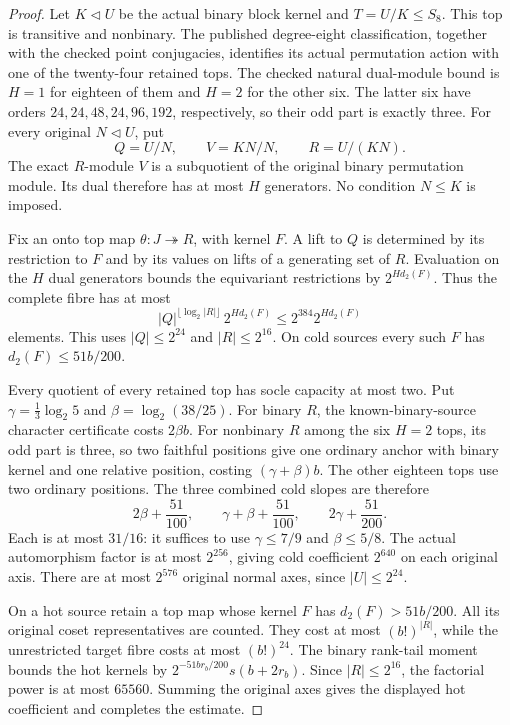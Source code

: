 \begin{proof}
Let $K\lhd U$ be the actual binary block kernel and $T=U/K\leq S_8$.
This top is transitive and nonbinary. The published degree-eight
classification, together with the checked point conjugacies, identifies
its actual permutation action with one of the twenty-four retained tops.
The checked natural dual-module bound is $H=1$ for eighteen of them and
$H=2$ for the other six. The latter six have orders
$24,24,48,24,96,192$, respectively, so their odd part is exactly three.
For every original $N\lhd U$, put
\[
 Q=U/N,\qquad V=KN/N,\qquad R=U/(KN).
\]
The exact $R$-module $V$ is a subquotient of the original binary
permutation module. Its dual therefore has at most $H$ generators.
No condition $N\leq K$ is imposed.

Fix an onto top map $\theta:J\twoheadrightarrow R$, with kernel $F$.
A lift to $Q$ is determined by its restriction to $F$ and by its values
on lifts of a generating set of $R$. Evaluation on the $H$ dual
generators bounds the equivariant restrictions by $2^{H d_2(F)}$.
Thus the complete fibre has at most
\[
 |Q|^{\lfloor\log_2|R|\rfloor}\,2^{H d_2(F)}
 \leq 2^{384}2^{H d_2(F)}
\]
elements. This uses $|Q|\leq2^{24}$ and $|R|\leq2^{16}$.
On cold sources every such $F$ has $d_2(F)\leq51b/200$.

Every quotient of every retained top has socle capacity at most two.
Put $\gamma=\frac13\log_2 5$ and $\beta=\log_2(38/25)$.
For binary $R$, the known-binary-source character certificate costs
$2\beta b$. For nonbinary $R$ among the six $H=2$ tops, its odd
part is three, so two faithful positions give one ordinary anchor
with binary kernel and one relative position, costing
$(\gamma+\beta)b$. The other eighteen tops use two ordinary positions.
The three combined cold slopes are therefore
\[
 2\beta+\frac{51}{100},\qquad
 \gamma+\beta+\frac{51}{100},\qquad
 2\gamma+\frac{51}{200}.
\]
Each is at most $31/16$: it suffices to use
$\gamma\leq7/9$ and $\beta\leq5/8$.
The actual automorphism factor is at most $2^{256}$, giving cold
coefficient $2^{640}$ on each original axis. There are at most
$2^{576}$ original normal axes, since $|U|\leq2^{24}$.

On a hot source retain a top map whose kernel $F$ has
$d_2(F)>51b/200$. All its original coset representatives are counted.
They cost at most $(b!)^{|R|}$, while the unrestricted target fibre
costs at most $(b!)^{24}$. The binary rank-tail moment bounds the hot
kernels by $2^{-51br_b/200}s(b+2r_b)$. Since $|R|\leq2^{16}$,
the factorial power is at most $65560$. Summing the original axes
gives the displayed hot coefficient and completes the estimate.
\end{proof}

